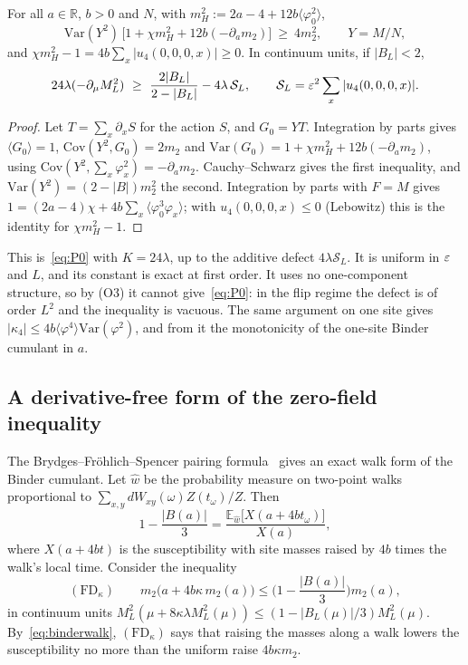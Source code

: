 \begin{theorem}\label{thm:zeromode}
For all $a\in\mathbb R$, $b>0$ and $N$, with $m_H^2:=2a-4+12b\langle\varphi_0^2\rangle$,
\[
\mathrm{Var}(Y^2)\,\big[1+\chi m_H^2+12b(-\partial_am_2)\big]\ \ge\ 4m_2^2,\qquad Y=M/N,
\]
and $\chi m_H^2-1=4b\sum_x|u_4(0,0,0,x)|\ge0$. In continuum units, if $|B_L|<2$,
\[
24\lambda(-\partial_\mu M_L^2)\ \ge\ \frac{2|B_L|}{2-|B_L|}-4\lambda\,\mathcal S_L,\qquad \mathcal S_L=\eps^2\sum_x|u_4(0,0,0,x)|.
\]
\end{theorem}

\begin{proof}
Let $T=\sum_x\partial_xS$ for the action $S$, and $G_0=YT$. Integration by parts gives $\langle G_0\rangle=1$, $\mathrm{Cov}(Y^2,G_0)=2m_2$ and $\mathrm{Var}(G_0)=1+\chi m_H^2+12b(-\partial_am_2)$, using $\mathrm{Cov}(Y^2,\sum_x\varphi_x^2)=-\partial_am_2$. Cauchy--Schwarz gives the first inequality, and $\mathrm{Var}(Y^2)=(2-|B|)m_2^2$ the second. Integration by parts with $F=M$ gives $1=(2a-4)\chi+4b\sum_x\langle\varphi_0^3\varphi_x\rangle$; with $u_4(0,0,0,x)\le0$ (Lebowitz) this is the identity for $\chi m_H^2-1$.
\end{proof}

This is~\eqref{eq:P0} with $K=24\lambda$, up to the additive defect $4\lambda\mathcal S_L$. It is uniform in $\varepsilon$ and $L$, and its constant is exact at first order. It uses no one-component structure, so by (O3) it cannot give~\eqref{eq:P0}: in the flip regime the defect is of order $L^2$ and the inequality is vacuous. The same argument on one site gives $|\kappa_4|\le4b\langle\varphi^4\rangle\mathrm{Var}(\varphi^2)$, and from it the monotonicity of the one-site Binder cumulant in $a$.

\subsection{A derivative-free form of the zero-field inequality}

The Brydges--Fr\"ohlich--Spencer pairing formula~\cite{BFS82,FFS92} gives an exact walk form of the Binder cumulant. Let $\hat w$ be the probability measure on two-point walks proportional to $\sum_{x,y}dW_{xy}(\omega)Z(t_\omega)/Z$. Then
\begin{equation}\label{eq:binderwalk}
1-\frac{|B(a)|}3=\frac{\mathbb E_{\hat w}\big[X(a+4bt_\omega)\big]}{X(a)} ,
\end{equation}
where $X(a+4bt)$ is the susceptibility with site masses raised by $4b$ times the walk's local time. Consider the inequality
\[
(\mathrm{FD}_\kappa)\qquad m_2\big(a+4b\kappa\,m_2(a)\big)\le\Big(1-\frac{|B(a)|}3\Big)m_2(a),
\]
in continuum units $M_L^2(\mu+8\kappa\lambda M_L^2(\mu))\le(1-|B_L(\mu)|/3)M_L^2(\mu)$. By~\eqref{eq:binderwalk}, $(\mathrm{FD}_\kappa)$ says that raising the masses along a walk lowers the susceptibility no more than the uniform raise $4b\kappa m_2$.

